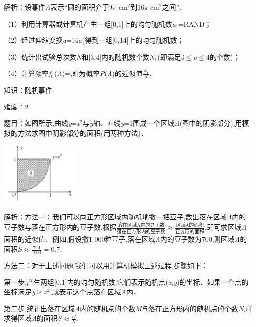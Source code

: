 \documentclass{article} %
\begin{document}
解析：设事件\textit{A}表示``圆的面积介于9$\pi$ cm${}^{2}$到16$\pi$ cm${}^{2}$之间''．

（1）利用计算器或计算机产生一组[0,1]上的均匀随机数\textit{a}${}_{1}$=RAND；

（2）经过伸缩变换\textit{a}=14\textit{a}${}_{1}$得到一组[0,14]上的均匀随机数；

（3）统计出试验总次数\textit{N}和[3,4]内的随机数个数\textit{N}${}_{1}$(即满足3$\mathrm{\le}$\textit{a}$\mathrm{\le}$4的个数)；

（4）计算频率\textit{f${}_{n}$}(\textit{A})=,即为概率\textit{P}(\textit{A})的近似值$\frac{N_1}{N}$．

知识：随机事件

难度：2

题目：如图所示,曲线\textit{y}=\textit{x}${}^{2}$与\textit{y}轴、直线\textit{y}=1围成一个区域\textit{A}(图中的阴影部分),用模拟的方法求图中阴影部分的面积(用两种方法)．

\includegraphics*[width=1.50in, height=1.23in, keepaspectratio=false]{image113}

解析：方法一：我们可以向正方形区域内随机地撒一把豆子,数出落在区域\textit{A}内的豆子数与落在正方形内的豆子数,根据$\frac{\text{落在区域A内的豆子数}}{\text{落在正方形内的豆子数}}\approx\frac{\text{区域A的面积}}{\text{正方形的面积}}$,即可求区域\textit{A}面积的近似值．例如,假设撒1 000粒豆子,落在区域\textit{A}内的豆子数为700,则区域\textit{A}的面积$S\approx\frac{700}{1000}=0.7$.

方法二：对于上述问题,我们可以用计算机模拟上述过程,步骤如下：

第一步,产生两组[0,1]内的均匀随机数,它们表示随机点(\textit{x},\textit{y})的坐标．如果一个点的坐标满足\textit{y}$\mathrm{\ge}$\textit{x}${}^{2}$,就表示这个点落在区域\textit{A}内．

第二步,统计出落在区域\textit{A}内的随机点的个数\textit{M}与落在正方形内的随机点的个数\textit{N},可求得区域\textit{A}的面积$S\approx\frac{M}{N}$.
\end{document}
